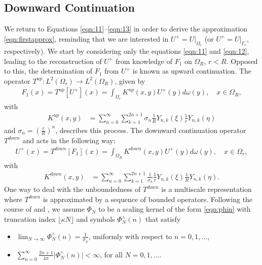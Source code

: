 \documentclass[a4paper, 10pt]{article}
\numberwithin{equation}{section}
\theoremstyle{definition}
\begin{document}
\subsection{Downward Continuation}\label{subsec:dc}

We return to Equations \eqref{eqn:11}--\eqref{eqn:13} in order to derive the approximation \eqref{eqn:firstapprox}, reminding that we are interested in $U^+=U|_{\Omega_r}$ (or $U^+=U|_{\Gamma_r}$, respectively). We start by considering only the equations \eqref{eqn:11} and \eqref{eqn:12}, leading to the reconstruction of $U^+$ from knowledge of $F_1$ on $\Omega_R$, $r<R$. Opposed to this, the determination of $F_1$ from $U^+$ is known as upward continuation. The operator $T^{up}:L^2(\Omega_r)\to L^2(\Omega_R)$, given by
\begin{align}\label{eqn:TrR}
F_1(x)={T}^{up}[U^+](x)=\int_{\Omega_r}K^{up}(x,y) U^+(y)d\omega(y),\quad x\in\Omega_R,
\end{align}
with 
\begin{align}\label{eqn:KrR}
K^{up}(x,y)&=\sum_{n=0}^\infty\sum_{k=1}^{2n+1}\sigma_n\frac{1}{R}Y_{n,k}\left(\xi\right)\frac{1}{r}Y_{n,k}\left(\eta\right)
\end{align}
and $\sigma_n=\left(\frac{r}{R}\right)^n$, describes this process. The downward continuation operator $T^{down}$ and acts in the following way:  
\begin{align}\label{eqn:TRr}
U^+(x)={T}^{down}[F_1](x)=\int_{\Omega_R}K^{down}(x,y) U^+(y)d\omega(y),\quad x\in\Omega_r,
\end{align}
with 
\begin{align}\label{eqn:KRr}
K^{down}(x,y)&=\sum_{n=0}^\infty\sum_{k=1}^{2n+1}\frac{1}{\sigma_n}\frac{1}{r}Y_{n,k}\left(\xi\right)\frac{1}{R}Y_{n,k}\left(\eta\right).
\end{align}
One way to deal with the unboundedness of $T^{down}$ is a multiscale representation where $T^{down}$ is approximated by a sequence of bounded operators. Following the course of \cite{freeden99} and \cite{schneider98}, we assume $\Phi_N$ to be a scaling kernel of the form \eqref{eqn:phin} with truncation index $\lfloor\kappa N\rfloor$ and symbols $\Phi_N^\wedge(n)$ that satisfy
\begin{itemize}
\item[(a)] $\lim_{N\to\infty}\Phi_N^\wedge(n)=\frac{1}{\sigma_n}$, uniformly with respect to $n=0,1,\ldots$,
\item[(b)] $\sum_{n=0}^\infty \frac{2n+1}{4\pi} \big|\Phi_N^\wedge(n)\big|< \infty$,  for all $N=0,1,\ldots$.
\end{itemize}
\end{document}
